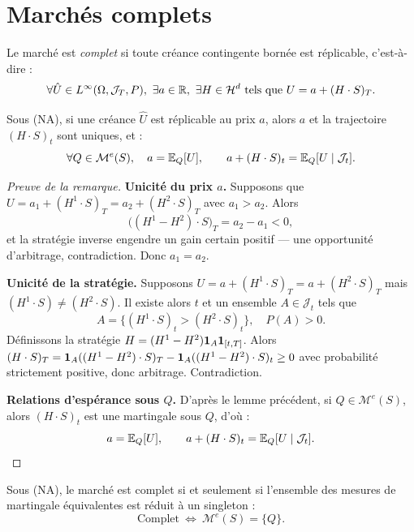 \chapter{Marchés complets}

\begin{definition}
Le marché est \emph{complet} si toute créance contingente bornée est réplicable, c'est-à-dire :
\begin{equation}
\forall \hat U \in L^\infty(\Omega,\mathcal{J}_T,P),\ \exists a\in\mathbb{R},\ \exists H\in\mathcal{H}^d
\text{ tels que } U = a + (H\cdot S)_T.
\end{equation}
\end{definition}

\begin{remarque}
Sous (NA), si une créance $\hat U$ est réplicable au prix $a$, alors $a$ et la trajectoire $(H\cdot S)_t$ sont uniques, et :
\[
\forall Q\in\mathcal{M}^e(S),\quad
a = \mathbb{E}_Q[U], \qquad a + (H\cdot S)_t = \mathbb{E}_Q[U \mid \mathcal{J}_t].
\]
\end{remarque}

\begin{proof}[Preuve de la remarque]
\textbf{Unicité du prix $a$.}  
Supposons que $U=a_1+(H^1\cdot S)_T=a_2+(H^2\cdot S)_T$ avec $a_1>a_2$.  
Alors
\[
\big((H^1 - H^2)\cdot S\big)_T = a_2 - a_1 < 0,
\]
et la stratégie inverse engendre un gain certain positif — une opportunité d'arbitrage, contradiction.  
Donc $a_1=a_2$.

\smallskip
\textbf{Unicité de la stratégie.}  
Supposons $U=a+(H^1\cdot S)_T=a+(H^2\cdot S)_T$ mais $(H^1\cdot S)\neq(H^2\cdot S)$.  
Il existe alors $t$ et un ensemble $A\in\mathcal{J}_t$ tels que
\[
A = \{(H^1\cdot S)_t > (H^2\cdot S)_t\},\quad P(A)>0.
\]
Définissons la stratégie $H = (H^1-H^2)\mathbf{1}_A \mathbf{1}_{[t,T]}$.  
Alors $(H\cdot S)_T = \mathbf{1}_A((H^1-H^2)\cdot S)_T - \mathbf{1}_A((H^1-H^2)\cdot S)_t \ge 0$ avec probabilité strictement positive, donc arbitrage. Contradiction.

\smallskip
\textbf{Relations d'espérance sous $Q$.}  
D'après le lemme précédent, si $Q\in\mathcal{M}^e(S)$, alors $(H\cdot S)_t$ est une martingale sous $Q$, d'où :
\[
a = \mathbb{E}_Q[U],\qquad a + (H\cdot S)_t = \mathbb{E}_Q[U\mid\mathcal{J}_t].
\]
\end{proof}

\begin{theoreme}
\label{thm:complet_singleton}
Sous (NA), le marché est complet si et seulement si l'ensemble des mesures de martingale équivalentes est réduit à un singleton :
\begin{equation}
\text{Complet} \ \Longleftrightarrow\ \mathcal{M}^e(S)=\{Q\}.
\end{equation}
\end{theoreme}

